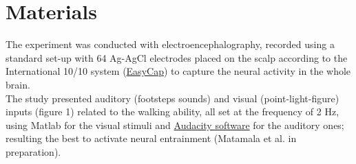 \section{Materials}
The experiment was conducted with electroencephalography, recorded using a standard set-up with 64 Ag-AgCl electrodes placed on the scalp according to the International 10/10 system (\href{https://www.easycap.de/}{EasyCap}) to capture the neural activity in the whole brain. \\
The study presented auditory (footsteps sounds) and visual (point-light-figure) inputs (figure 1) related to the walking ability, all set at the frequency of 2 Hz, using Matlab for the visual stimuli and \href{https://www.audacityteam.org/}{Audacity software} for the auditory ones; resulting the best to activate neural entrainment (Matamala et al. in preparation).

